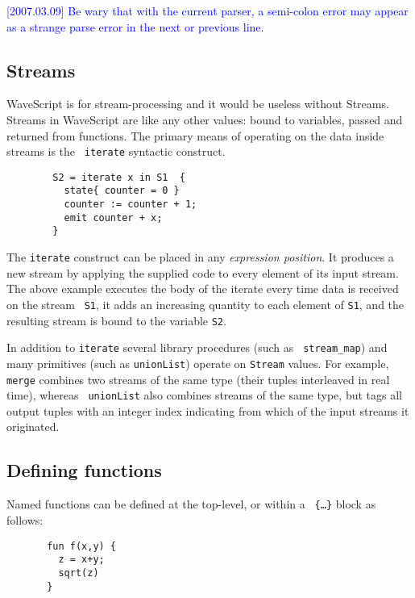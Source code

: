 \documentclass[twocolumn]{report}
\newcommand{\rednote}[1]{{\textcolor{blue}{#1}}}
\begin{document}
\rednote{[2007.03.09] Be wary that with the current parser, a
  semi-colon error may appear as a strange parse error in the next
  or previous line.}

\subsection{Streams}

WaveScript is for stream-processing and it would be useless without
Streams.  
Streams in WaveScript are like any other values: bound to variables,
passed and returned from functions.
The primary means of operating on the data inside streams is the {\tt
  iterate} syntactic construct.

\begin{verbatim}
        S2 = iterate x in S1  {
          state{ counter = 0 }
          counter := counter + 1;
          emit counter + x;
        }
\end{verbatim}

The {\tt iterate} construct can be placed in any {\em expression
position}.  It produces a new stream by applying the supplied code to
every element of its input stream.  The above example executes the
body of the iterate every time data is received on the stream {\tt
  S1}, it adds an increasing quantity to each element of {\tt S1}, and the
resulting stream is bound to the variable {\tt S2}.

In addition to {\tt iterate} several library procedures (such as {\tt
stream\_map}) and many primitives (such as {\tt unionList}) operate on
{\tt Stream} values.  For example, {\tt merge} combines two streams of the same
type (their tuples interleaved in real time), whereas {\tt
  unionList} also combines streams of the same type, but tags all
output tuples with an integer index indicating from which of the input
streams it originated.


\subsection{Defining functions}
\label{udfs}

Named functions can be defined at the top-level, or within a {\tt
  \{\ldots\}} block as follows:
\begin{verbatim}
       fun f(x,y) {
         z = x+y;
         sqrt(z)
       }
\end{verbatim}
\end{document}
